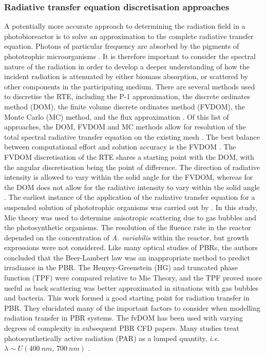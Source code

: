 \subsubsection{Radiative transfer equation discretisation approaches}
\label{S:2.3.2}
A potentially more accurate approach to determining the radiation field in a photobioreactor is to solve an approximation to the complete radiative transfer equation. Photons of particular frequency are absorbed by the pigments of phototrophic microorganisms \cite{mcdermott1995}. It is therefore important to consider the spectral nature of the radiation in order to develop a deeper understanding of how the incident radiation is attenuated by either biomass absorption, or scattered by other components in the participating medium. There are several methods used to discretise the RTE, including the P-1 approximation, the discrete ordinates method (DOM), the finite volume discrete ordinates method (FVDOM), the Monte Carlo (MC) method, and the flux approximation \cite{coelho2008}. Of this list of approaches, the DOM, FVDOM and MC methods allow for resolution of the total spectral radiative transfer equation on the existing mesh \cite{kong2014}. The best balance between computational effort and solution accuracy is the FVDOM \cite{modest2003,kong2014} . The FVDOM discretisation of the RTE shares a starting point with the DOM, with the angular discretisation being the point of difference. The direction of radiative intensity is allowed to vary within the solid angle for the FVDOM, whereas for the DOM does not allow for the radiative intensity to vary within the solid angle \cite{coelho2014}.
\skippingparagraph
The earliest instance of the application of the radiative transfer equation for a suspended solution of phototrophic organisms was carried out by \cite{berberoglu2007}. In this study, Mie theory was used to determine anisotropic scattering due to gas bubbles and the photosynthetic organisms. The resolution of the fluence rate in the reactor depended on the concentration of \textit{A. variabilis} within the reactor, but growth expressions were not considered. Like many optical studies of PBRs, the authors concluded that the Beer-Lambert law was an inappropriate method to predict irradiance in the PBR. The Henyey-Greenstein (HG) and truncated phase function (TPF) were compared relative to Mie Theory, and the TPF proved more useful as back scattering was better approximated in situations with gas bubbles and bacteria. This work formed a good starting point for radiation transfer in PBR. They elucidated many of the important factors to consider when modelling radiation transfer in PBR systems. \skippingparagraph
The fvDOM has been used with varying degrees of complexity in subsequent PBR CFD papers. Many studies treat photosynthetically active radiation (PAR) as a lumped quantity, \textit{i.e.} $\lambda \sim U(400\ nm ,\, 700\ nm)$
\cite{soman2015,pandey2015,wheaton2012,huang2011,eltayeb2010}. 
\skippingparagraph

